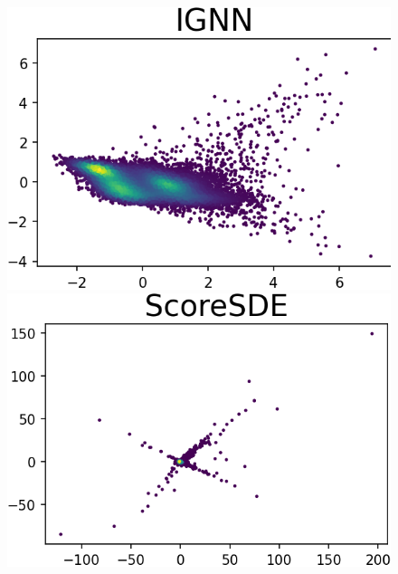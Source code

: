 \documentclass{article}
\theoremstyle{remark}
\theoremstyle{plain}
\begin{document}
{\begin{figure}[!t]
\begin{minipage}{0.155\textwidth}
    \end{minipage}
    \begin{minipage}{0.155\textwidth}
        \vspace{-0.2in}\includegraphics[width=\linewidth]{power_PCA_2D_compare_IGNN.png}
    \end{minipage}
    \begin{minipage}{0.16\textwidth}
        \vspace{-0.2in}\includegraphics[width=\linewidth]{power_PCA_2D_compare_ScoreSDE.png}
    \end{minipage}


\end{figure}}
\end{document}
